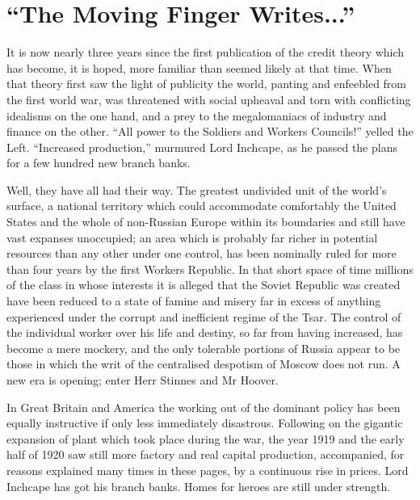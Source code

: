 \documentclass{book}
\begin{document}
\chapter{“The Moving Finger Writes...”}
\label{chapter-14}
It is now nearly three years since the first publication of the credit theory which has become, it is hoped, more familiar than seemed likely at that time. When that theory first saw the light of publicity the world, panting and enfeebled from the first world war, was threatened with social upheaval and torn with conflicting idealisms on the one hand, and a prey to the megalomaniacs of industry and finance on the other. “All power to the Soldiers and Workers Councils!” yelled the Left. “Increased production,” murmured Lord Inchcape, as he passed the plans for a few hundred new branch banks.

Well, they have all had their way. The greatest undivided unit of the world’s surface, a national territory which could accommodate comfortably the United States and the whole of non-Russian Europe within its boundaries and still have vast expanses unoccupied; an area which is probably far richer in potential resources than any other under one control, has been nominally ruled for more than four years by the first Workers Republic. In that short space of time millions of the class in whose interests it is alleged that the Soviet Republic was created have been reduced to a state of famine and misery far in excess of anything experienced under the corrupt and inefficient regime of the Tsar. The control of the individual worker over his life and destiny, so far from having increased, has become a mere mockery, and the only tolerable portions of Russia appear to be those in which the writ of the centralised despotism of Moscow does not run. A new era is opening; enter Herr Stinnes and Mr Hoover.

In Great Britain and America the working out of the dominant policy has been equally instructive if only less immediately disastrous. Following on the gigantic expansion of plant which took place during the war, the year 1919 and the early half of 1920 saw still more factory and real capital production, accompanied, for reasons explained many times in these pages, by a continuous rise in prices. Lord Inchcape has got his branch banks. Homes for heroes are still under strength.
\end{document}
